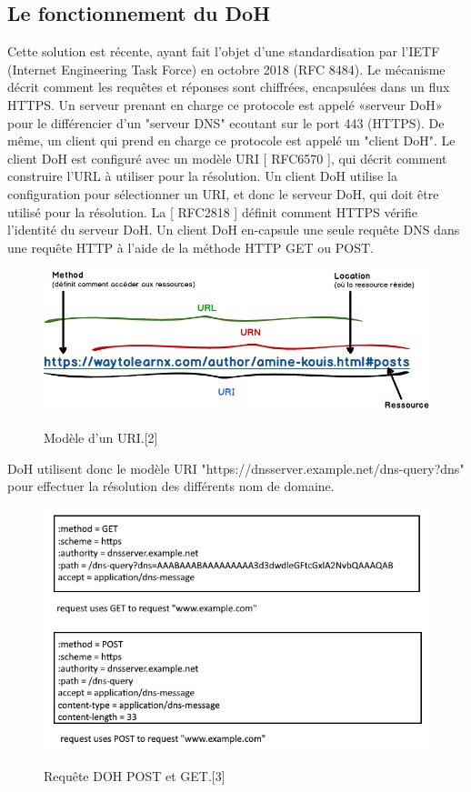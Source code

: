 \documentclass[a4paper,12pt]{article}
\begin{document}
	\subsection{Le fonctionnement du DoH}
	Cette solution est récente, ayant fait l’objet d’une standardisation par l’IETF (Internet Engineering Task Force) en octobre 2018 (RFC 8484).  Le mécanisme décrit comment les requêtes et réponses sont chiffrées, encapsulées dans un flux HTTPS.
	Un serveur prenant en charge ce protocole est appelé «serveur DoH» pour
	le différencier d'un "serveur DNS" ecoutant sur le port 443 (HTTPS). 
	De même, un client qui prend en charge ce protocole est appelé un "client DoH".
	Le client DoH est configuré avec un modèle URI [ RFC6570 ], qui
	décrit comment construire l'URL à utiliser pour la résolution.
	Un client DoH utilise la configuration pour sélectionner un URI, et donc le serveur DoH, qui doit être utilisé pour la résolution. La [ RFC2818 ] définit comment	HTTPS vérifie l'identité du serveur DoH.
	Un client DoH en-capsule une seule requête DNS dans une requête HTTP à l'aide de 
	la méthode HTTP GET ou POST.
	\begin{figure}[H]
		\begin{center}
			{\includegraphics[scale=0.5]{Images/difference-entre-uri-et-url.png}}
		\end{center}
		\caption{Modèle d'un URI.[2]}		 
		
	\end{figure}
	DoH utilisent donc le modèle URI  "https://dnsserver.example.net/dns-query{?dns}" pour effectuer la résolution des différents nom de domaine. 
	\begin{figure}[H]
		\begin{center}
			{\includegraphics[scale=0.5]{Images/requetedoh.png}}
		\end{center}
		\caption{Requête DOH POST et GET.[3]}		 
		
	\end{figure}
\end{document}
